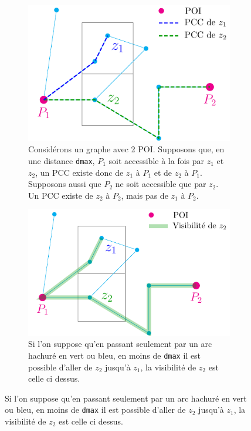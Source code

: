 \begin{figure}[!ht]
    \centering
    \begin{subfigure}[t]{0.3\textwidth}
        \centering
        \includegraphics[width=0.92\linewidth]{PDFs/graph.pdf}
    \caption{Considérons un graphe avec 2 POI. Supposons que, en une distance \texttt{dmax}, $P_1$ soit accessible à la fois par $z_1$ et $z_2$, un PCC existe donc de $z_1$ à $P_1$ et de $z_2$ à $P_1$. Supposons aussi que $P_2$ ne soit accessible que par $z_2$. Un PCC existe de $z_2$ à $P_2$, mais pas de $z_1$ à $P_2$. }
    \end{subfigure}
    \hfill
    \begin{subfigure}[t]{0.3\textwidth}
        \centering
        \includegraphics[width=1\linewidth]{PDFs/visi_z2.pdf}
    \caption{Si l'on suppose qu'en passant seulement par un arc hachuré en vert ou bleu, en moins de \texttt{dmax} il est possible d'aller de $z_2$ jusqu'à $z_1$, la visibilité de $z_2$ est celle ci dessus.}
    \end{subfigure}

\end{figure}
